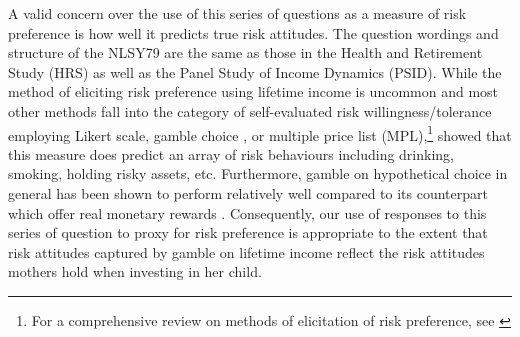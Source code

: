 \documentclass[]{article}
\begin{document}
A valid concern over the use of this series of questions as a measure of risk preference is how well it predicts true risk attitudes. The question wordings and structure of the NLSY79 are the same as those in the Health and Retirement Study (HRS) as well as the Panel Study of Income Dynamics (PSID). While the method of eliciting risk preference using lifetime income is uncommon and most other methods fall into the category of self-evaluated risk willingness/tolerance employing Likert scale, gamble choice \citep{eckel2002sex}, or multiple price list (MPL),\footnote{For a comprehensive review on methods of elicitation of risk preference, see \citet{charness2013experimental}} \citet{barsky1997preference} showed that this measure does predict an array of risk behaviours including drinking, smoking, holding risky assets, etc. Furthermore, gamble on hypothetical choice in general has been shown to perform relatively well compared to its counterpart which offer real monetary rewards \citep{binswanger1981attitudes, camerer1999effects, dohmen2005individual}. Consequently, our use of responses to this series of question to proxy for risk preference is appropriate to the extent that risk attitudes captured by gamble on lifetime income reflect the risk attitudes mothers hold when investing in her child.
\end{document}
